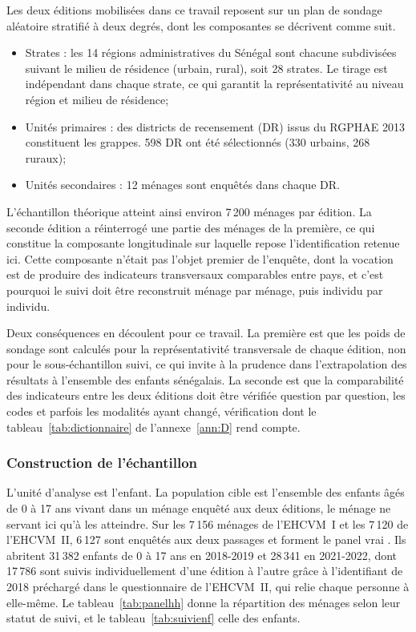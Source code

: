 Les deux éditions mobilisées dans ce travail reposent sur un plan de sondage
aléatoire stratifié à deux degrés, dont les composantes se décrivent comme
suit.

\begin{itemize}
  \item Strates : les 14 régions administratives du Sénégal sont chacune
  subdivisées suivant le milieu de résidence (urbain, rural), soit 28 strates.
  Le tirage est indépendant dans chaque strate, ce qui garantit la
  représentativité au niveau région et milieu de résidence;
  \item Unités primaires : des districts
  de recensement (DR) issus du RGPHAE 2013 constituent les grappes.
  598 DR ont été sélectionnés (330 urbains, 268 ruraux);
  \item Unités secondaires : 12 ménages
  sont enquêtés dans chaque DR.
\end{itemize}

L'échantillon théorique atteint ainsi environ 7\,200 ménages par édition. La
seconde édition a réinterrogé une partie des ménages de la première, ce qui
constitue la composante longitudinale sur laquelle repose l'identification
retenue ici. Cette composante n'était pas l'objet premier de l'enquête, dont la
vocation est de produire des indicateurs transversaux comparables entre pays,
et c'est pourquoi le suivi doit être reconstruit ménage par ménage, puis
individu par individu.

Deux conséquences en découlent pour ce travail. La première est que les poids
de sondage sont calculés pour la représentativité transversale de chaque édition,
non pour le sous-échantillon suivi, ce qui invite à la prudence dans
l'extrapolation des résultats à l'ensemble des enfants sénégalais. La seconde
est que la comparabilité des indicateurs entre les deux éditions doit être
vérifiée question par question, les codes et parfois les modalités ayant changé,
vérification dont le tableau~\ref{tab:dictionnaire} de l'annexe~\ref{ann:D} rend compte.

\subsubsection{Construction de l'échantillon}
\label{subsec:panel_enfants}

L'unité d'analyse est l'enfant. La population cible est l'ensemble des enfants
âgés de 0 à 17 ans vivant dans un ménage enquêté aux deux éditions, le ménage ne
servant ici qu'à les atteindre. Sur les 7\,156 ménages de l'EHCVM~I et les
7\,120 de l'EHCVM~II, 6\,127 sont enquêtés aux deux passages et forment le
panel vrai
\parencite{ansd2022}. Ils abritent 31\,382 enfants de 0 à 17 ans en 2018-2019
et 28\,341 en 2021-2022, dont 17\,786 sont suivis individuellement d'une
édition à l'autre grâce à l'identifiant de 2018 préchargé dans le questionnaire
de l'EHCVM~II, qui relie chaque
personne à elle-même. Le
tableau~\ref{tab:panelhh} donne la répartition des ménages selon leur statut
de suivi, et le tableau~\ref{tab:suivienf} celle des enfants.

